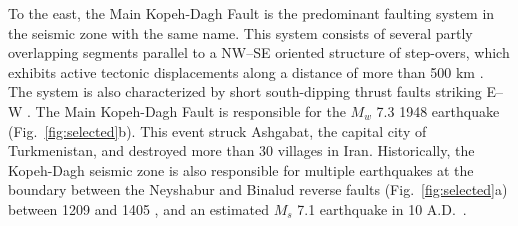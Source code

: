To the east, the Main Kopeh-Dagh Fault is the predominant faulting system in the seismic zone with the same name. This system consists of several partly overlapping segments parallel to a NW--SE oriented structure of step-overs, which exhibits active tectonic displacements along a distance of more than 500 km \citep{Trifonov1978}. The system is also characterized by short south-dipping thrust faults striking E--W \citep{Berberian2001}. The Main Kopeh-Dagh Fault is responsible for the $M_w$ 7.3 1948 earthquake (Fig.~\ref{fig:selected}b). This event struck Ashgabat, the capital city of Turkmenistan, and destroyed more than 30 villages in Iran. Historically, the Kopeh-Dagh seismic zone is also responsible for multiple earthquakes at the boundary between the Neyshabur and Binalud reverse faults (Fig.~\ref{fig:selected}a) between 1209 and 1405 \citep{Berberian1999}, and an estimated $M_s$ 7.1 earthquake in 10 A.D.~\citep{Berberian2001}.









